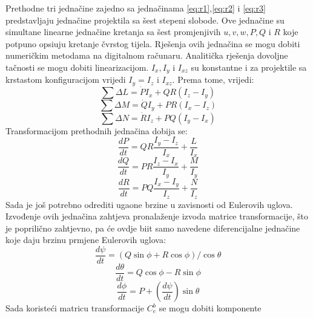 Prethodne tri jednačine zajedno sa jednačinama \ref{eq:r1},\ref{eq:r2} i \ref{eq:r3} predstavljaju
jednačine projektila sa šest stepeni slobode. Ove jednačine su simultane linearne jednačine 
kretanja sa šest promjenjivih $u,v,w,P,Q$ i $R$ koje potpuno opsiuju kretanje 
čvrstog tijela. Rješenja ovih jednačina se mogu dobiti numeričkim metodama na digitalnom 
računaru. Analitička rješenja dovoljne tačnosti se mogu dobiti linearizacijom. $I_x,I_y$ i $I_{xz}$ su konstantne 
i za projektile sa krstastom konfiguracijom vrijedi $I_y=I_z$ i $I_{xz}$. Prema tome, vrijedi:
\begin{equation}
    \sum \Delta L=\dot{P}I_x+QR(I_z-I_y)
\end{equation}
\begin{equation}
    \sum \Delta M=\dot{Q}I_y+PR(I_x-I_z)
\end{equation}
\begin{equation}
    \sum \Delta N=\dot{R}I_z+PQ(I_y-I_x)
\end{equation}
Transformacijom prethodnih jednačina dobija se:
\begin{equation}
    \frac{dP}{dt}=QR\frac{I_y-I_z}{I_x}+\frac{L}{I_x}
\end{equation}
\begin{equation}
    \frac{dQ}{dt}=PR\frac{I_z-I_x}{I_y}+\frac{M}{I_y}
\end{equation}
\begin{equation}
    \frac{dR}{dt}=PQ\frac{I_x-I_y}{I_z}+\frac{N}{I_z}
\end{equation}
Sada je još potrebno odrediti ugaone brzine u zavisnosti od Eulerovih uglova. Izvođenje ovih jednačina zahtjeva 
pronalaženje izvoda matrice transformacije, što je poprilično zahtjevno, pa će ovdje biit samo navedene 
diferencijalne jednačine koje daju brzinu prmjene Eulerovih uglova:
\begin{equation}
    \frac{d\psi}{dt}=(Q\sin\phi +R\cos\phi)/\cos\theta
\end{equation}
\begin{equation}
    \frac{d\theta}{dt}=Q\cos\phi-R\sin\phi
\end{equation}
\begin{equation}
    \frac{d\phi}{dt}=P+\left( \frac{d\psi}{dt} \right)\sin\theta
\end{equation}
Sada koristeći matricu transformacije $C_e^b$ se mogu dobiti komponente
